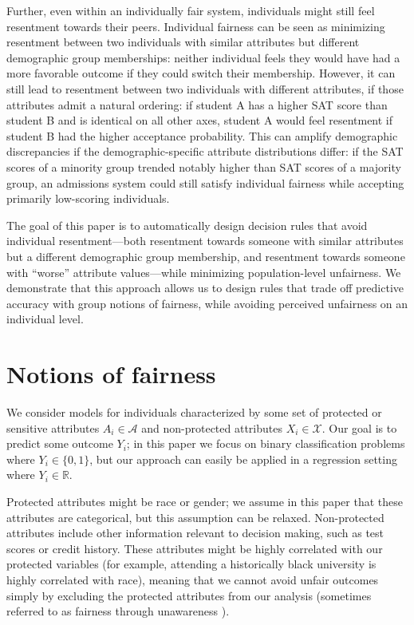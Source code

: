     Further, even within an individually fair system, individuals might still feel resentment towards their peers. Individual fairness can be seen as minimizing resentment between two individuals with similar attributes but different demographic group memberships: neither individual feels they would have had a more favorable outcome if they could switch their membership. However, it can still lead to resentment between two individuals with different attributes, if those attributes admit a natural ordering: if student A has a higher SAT score than student B and is identical on all other axes, student A would feel resentment if student B had the higher acceptance probability. This can amplify demographic discrepancies if the demographic-specific attribute distributions differ: if the SAT scores of a minority group trended notably higher than SAT scores of a majority group, an admissions system could still satisfy individual fairness while accepting primarily low-scoring individuals.

    The goal of this paper is to automatically design decision rules that avoid individual resentment---both resentment towards someone with similar attributes but a different demographic group membership, and resentment towards someone with ``worse'' attribute values---while minimizing population-level unfairness. We demonstrate that this approach allows us to design rules that trade off predictive accuracy with group notions of fairness, while avoiding perceived unfairness on an individual level.

\section{Notions of fairness}\label{sec:bg}

    We consider models for individuals characterized by some set of protected or sensitive attributes $A_i \in \mathcal{A}$ and non-protected attributes $X_i \in \mathcal{X}$. Our goal is to predict some outcome $Y_i$; in this paper we focus on binary classification problems where $Y_i \in \{0, 1\}$, but our approach can easily be applied in a regression setting where $Y_i\in \mathbb{R}$.

    Protected attributes might be race or gender; we assume in this paper that these attributes are categorical, but this assumption can be relaxed. Non-protected attributes include other information relevant to decision making, such as test scores or credit history. These attributes might be highly correlated with our protected variables (for example, attending a historically black university is highly correlated with race), meaning that we cannot avoid unfair outcomes simply by excluding the protected attributes from our analysis (sometimes referred to as fairness through unawareness \citep{dwork2012fairness}).

